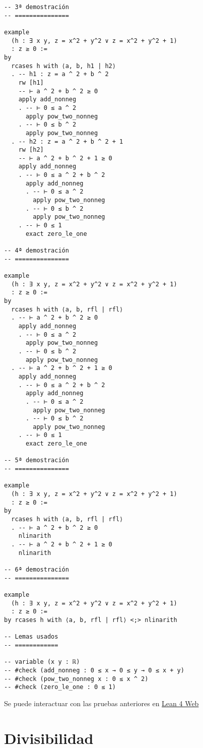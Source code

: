 \begin{verbatim}
-- 3ª demostración
-- ===============

example
  (h : ∃ x y, z = x^2 + y^2 ∨ z = x^2 + y^2 + 1)
  : z ≥ 0 :=
by
  rcases h with ⟨a, b, h1 | h2⟩
  . -- h1 : z = a ^ 2 + b ^ 2
    rw [h1]
    -- ⊢ a ^ 2 + b ^ 2 ≥ 0
    apply add_nonneg
    . -- ⊢ 0 ≤ a ^ 2
      apply pow_two_nonneg
    . -- ⊢ 0 ≤ b ^ 2
      apply pow_two_nonneg
  . -- h2 : z = a ^ 2 + b ^ 2 + 1
    rw [h2]
    -- ⊢ a ^ 2 + b ^ 2 + 1 ≥ 0
    apply add_nonneg
    . -- ⊢ 0 ≤ a ^ 2 + b ^ 2
      apply add_nonneg
      . -- ⊢ 0 ≤ a ^ 2
        apply pow_two_nonneg
      . -- ⊢ 0 ≤ b ^ 2
        apply pow_two_nonneg
    . -- ⊢ 0 ≤ 1
      exact zero_le_one

-- 4ª demostración
-- ===============

example
  (h : ∃ x y, z = x^2 + y^2 ∨ z = x^2 + y^2 + 1)
  : z ≥ 0 :=
by
  rcases h with ⟨a, b, rfl | rfl⟩
  . -- ⊢ a ^ 2 + b ^ 2 ≥ 0
    apply add_nonneg
    . -- ⊢ 0 ≤ a ^ 2
      apply pow_two_nonneg
    . -- ⊢ 0 ≤ b ^ 2
      apply pow_two_nonneg
  . -- ⊢ a ^ 2 + b ^ 2 + 1 ≥ 0
    apply add_nonneg
    . -- ⊢ 0 ≤ a ^ 2 + b ^ 2
      apply add_nonneg
      . -- ⊢ 0 ≤ a ^ 2
        apply pow_two_nonneg
      . -- ⊢ 0 ≤ b ^ 2
        apply pow_two_nonneg
    . -- ⊢ 0 ≤ 1
      exact zero_le_one

-- 5ª demostración
-- ===============

example
  (h : ∃ x y, z = x^2 + y^2 ∨ z = x^2 + y^2 + 1)
  : z ≥ 0 :=
by
  rcases h with ⟨a, b, rfl | rfl⟩
  . -- ⊢ a ^ 2 + b ^ 2 ≥ 0
    nlinarith
  . -- ⊢ a ^ 2 + b ^ 2 + 1 ≥ 0
    nlinarith

-- 6ª demostración
-- ===============

example
  (h : ∃ x y, z = x^2 + y^2 ∨ z = x^2 + y^2 + 1)
  : z ≥ 0 :=
by rcases h with ⟨a, b, rfl | rfl⟩ <;> nlinarith

-- Lemas usados
-- ============

-- variable (x y : ℝ)
-- #check (add_nonneg : 0 ≤ x → 0 ≤ y → 0 ≤ x + y)
-- #check (pow_two_nonneg x : 0 ≤ x ^ 2)
-- #check (zero_le_one : 0 ≤ 1)
\end{verbatim}
Se puede interactuar con las pruebas anteriores en \href{https://lean.math.hhu.de/\#url=https://raw.githubusercontent.com/jaalonso/Calculemus2/main/src/Desigualdad\_con\_rcases.lean.lean}{Lean 4 Web}

\chapter{Divisibilidad}
\label{sec:orge2069a1}

